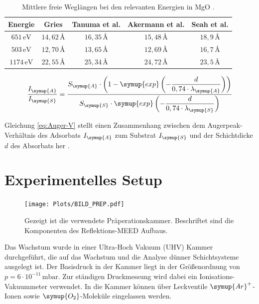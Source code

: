 \begin{table}
        \centering
        \begin{tabular}{c| c c c c}
          \toprule
          Energie & Gries \cite{gries1996universal} & Tanuma et al. \cite{tanuma1994calculations}& Akermann et al. \cite{akkerman1996inelastic}& Seah et al. \cite{seah1979quantitative}\\
          \midrule
          {$651\,\si{\eV}$} & {$14,62\,\si{\angstrom}$} & {$16,35\,\si{\angstrom}$} & {$15,48\,\si{\angstrom}$} & {$18,9\,\si{\angstrom}$}\\
          {$503\,\si{\eV}$} & {$12,70\,\si{\angstrom}$} & {$13,65\,\si{\angstrom}$} & {$12,69\,\si{\angstrom}$} & {$16,7\,\si{\angstrom}$}\\
          {$1174\,\si{\eV}$} & {$22,55\,\si{\angstrom}$}& {$25,34\,\si{\angstrom}$}& {$24,72\,\si{\angstrom}$}& {$23,5\,\si{\angstrom}$}\\
          \bottomrule
        \end{tabular}
        \caption{Mittlere freie Weglängen bei den relevanten Energien in MgO \cite{Wachstum}.}
        \label{tab:AugerM}
      \end{table}


\begin{equation}
        \dfrac{I_{\symup{A}}}{I_{\symup{S}}}=\dfrac{S_{\symup{A}}\cdot \left( 1-\symup{exp}\left( -\dfrac{d}{0,74\cdot \lambda_{\symup{A}}} \right) \right) }  {S_{\symup{S}}\cdot \symup{exp} \left( -\dfrac{d}{0,74 \cdot\lambda_{\symup{S}}} \right) }
        \label{eq:Auger-V}
\end{equation} 

Gleichung \ref{eq:Auger-V} stellt einen Zusammenhang zwischen dem Augerpeak-Verhältnis des Adsorbats $I_{\symup{A}}$ zum Substrat $I_{\symup{S}}$ und der Schichtdicke $d$
des Absorbats her \cite{Wachstum}. 
\newpage


\section{Experimentelles Setup}

\begin{figure}
        \centering
        \texttt{[image: Plots/BILD\_PREP.pdf]}
        \caption{Gezeigt ist die verwendete Präperationskammer. Beschriftet sind die Komponenten des Reflektions-MEED Aufbaus.}
        \label{fig:BILD_PREP}
\end{figure}

Das Wachstum wurde in einer Ultra-Hoch Vakuum (UHV) Kammer durchgeführt, die auf das Wachstum und die Analyse dünner Schichtsysteme ausgelegt ist.
Der Basisdruck in der Kammer liegt in der Größenordnung von $p=6\cdot 10^{-11}\,\si{\milli\bar}$.
Zur ständigen Druckmessung wird dabei ein Ionisations-Vakuummeter verwendet.
In die Kammer können über Leckventile $\symup{Ar}^+$-Ionen sowie $\symup{O_2}$-Moleküle 
eingelassen werden. 

